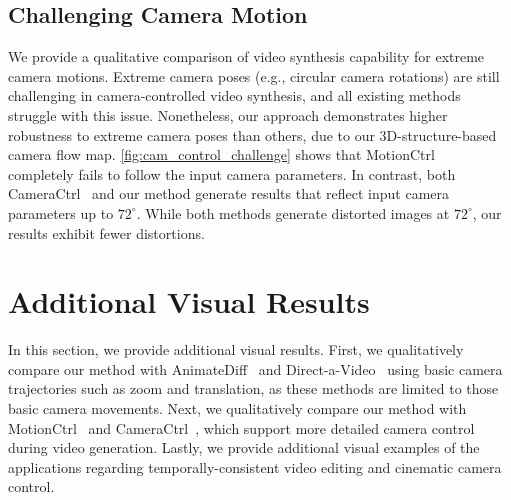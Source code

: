 \begin{table}[!t]
\centering
{}
\vspace{-3mm}
\caption{
Quantitative comparison on 3D scene consistency using the PSNR scores.
}
\vspace{-4mm}
\label{table:3d_consistency}
\end{table}



\subsection{Challenging Camera Motion}
We provide a qualitative comparison of video synthesis capability for extreme camera motions.
Extreme camera poses (e.g., circular camera rotations) are still challenging in camera-controlled video synthesis, and all existing methods struggle with this issue. 
Nonetheless, our approach demonstrates higher robustness to extreme camera poses than others, due to our 3D-structure-based camera flow map.
\cref{fig:cam_control_challenge} shows that MotionCtrl~\cite{wang2024motionctrl} completely fails to follow the input camera parameters. In contrast, both CameraCtrl~\cite{he2024cameractrl} and our method generate results that reflect input camera parameters up to $72^\circ$. 
While both methods generate distorted images at $72^\circ$, our results exhibit fewer distortions.


\section{Additional Visual Results}
In this section, we provide additional visual results.
First, we qualitatively compare our method with AnimateDiff~\cite{guo2023animatediff} and Direct-a-Video~\cite{yang2024direct} using basic camera trajectories such as zoom and translation, as these methods are limited to those basic camera movements.
Next, we qualitatively compare our method with MotionCtrl~\cite{wang2024motionctrl} and CameraCtrl~\cite{he2024cameractrl}, which support more detailed camera control during video generation.
Lastly, we provide additional visual examples of the applications regarding temporally-consistent video editing and cinematic camera control.


